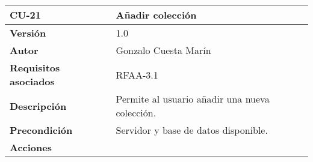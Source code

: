 \begin{longtable}[]{@{}ll@{}}
\toprule
\begin{minipage}[b]{0.18\columnwidth}\raggedright
\textbf{CU-21}\strut
\end{minipage} & \begin{minipage}[b]{0.76\columnwidth}\raggedright
\textbf{Añadir colección}\strut
\end{minipage}\tabularnewline
\midrule
\endhead
\begin{minipage}[t]{0.18\columnwidth}\raggedright
\textbf{Versión}\strut
\end{minipage} & \begin{minipage}[t]{0.76\columnwidth}\raggedright
1.0\strut
\end{minipage}\tabularnewline
\begin{minipage}[t]{0.18\columnwidth}\raggedright
\textbf{Autor}\strut
\end{minipage} & \begin{minipage}[t]{0.76\columnwidth}\raggedright
Gonzalo Cuesta Marín\strut
\end{minipage}\tabularnewline
\begin{minipage}[t]{0.18\columnwidth}\raggedright
\textbf{Requisitos asociados}\strut
\end{minipage} & \begin{minipage}[t]{0.76\columnwidth}\raggedright
RFAA-3.1\strut
\end{minipage}\tabularnewline
\begin{minipage}[t]{0.18\columnwidth}\raggedright
\textbf{Descripción}\strut
\end{minipage} & \begin{minipage}[t]{0.76\columnwidth}\raggedright
Permite al usuario añadir una nueva colección.\strut
\end{minipage}\tabularnewline
\begin{minipage}[t]{0.18\columnwidth}\raggedright
\textbf{Precondición}\strut
\end{minipage} & \begin{minipage}[t]{0.76\columnwidth}\raggedright
Servidor y base de datos disponible.\strut
\end{minipage}\tabularnewline
\begin{minipage}[t]{0.18\columnwidth}\raggedright
\textbf{Acciones}\strut
\end{minipage} & \begin{minipage}[t]{0.76\columnwidth}\raggedright
\begin{enumerate}
\def\labelenumi{\arabic{enumi}.}

\end{enumerate}
\end{minipage}
\end{longtable}
